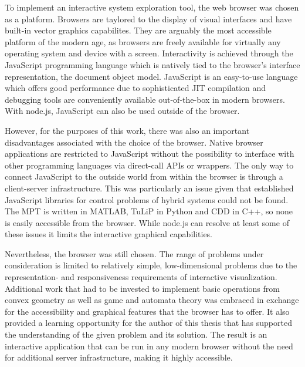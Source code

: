 To implement an interactive system exploration tool, the web browser was chosen as a platform.
Browsers are taylored to the display of visual interfaces and have built-in vector graphics capabilites.
They are arguably the most accessible platform of the modern age, as browsers are freely available for virtually any operating system and device with a screen.
Interactivity is achieved through the JavaScript programming language which is natively tied to the browser's interface representation, the document object model.
JavaScript is an easy-to-use language which offers good performance due to sophisticated JIT compilation and debugging tools are conveniently available out-of-the-box in modern browsers.
With node.js, JavaScript can also be used outside of the browser.

However, for the purposes of this work, there was also an important disadvantages associated with the choice of the browser.
Native browser applications are restricted to JavaScript without the possibility to interface with other programming languages via direct-call APIs or wrappers.
The only way to connect JavaScript to the outside world from within the browser is through a client-server infrastructure.
This was particularly an issue given that established JavaScript libraries for control problems of hybrid systems could not be found.
The MPT is written in MATLAB, TuLiP in Python and CDD in C++, so none is easily accessible from the browser.
While node.js can resolve at least some of these issues it limits the interactive graphical capabilities.

Nevertheless, the browser was still chosen.
The range of problems under consideration is limited to relatively simple, low-dimensional problems due to the representation- and responsiveness requirements of interactive visualization.
Additional work that had to be invested to implement basic operations from convex geometry as well as game and automata theory was embraced in exchange for the accessibility and graphical features that the browser has to offer.
It also provided a learning opportunity for the author of this thesis that has supported the understanding of the given problem and its solution.
The result is an interactive application that can be run in any modern browser without the need for additional server infrastructure, making it highly accessible.

